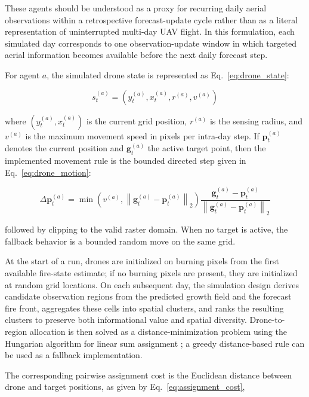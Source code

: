 \documentclass[10pt,letterpaper]{article}
\begin{document}
These agents should be understood as a proxy for recurring daily aerial
observations within a retrospective forecast-update cycle rather than as
a literal representation of uninterrupted multi-day UAV flight. In this
formulation, each simulated day corresponds to one observation-update
window in which targeted aerial information becomes available before the
next daily forecast step.

For agent $a$, the simulated drone state is represented as
Eq.~\ref{eq:drone_state}:

\begin{equation}
s_t^{(a)}=\left(y_t^{(a)},x_t^{(a)},r^{(a)},v^{(a)}\right)
\label{eq:drone_state}
\end{equation}

where $(y_t^{(a)},x_t^{(a)})$ is the current grid position,
$r^{(a)}$ is the sensing radius, and $v^{(a)}$ is the maximum movement
speed in pixels per intra-day step. If $\mathbf{p}_t^{(a)}$
denotes the current position and $\mathbf{g}_t^{(a)}$ the active target
point, then the implemented movement rule is the bounded directed step
given in Eq.~\ref{eq:drone_motion}:

\begin{equation}
\Delta \mathbf{p}_t^{(a)}=
\min\left(v^{(a)},\left\|\mathbf{g}_t^{(a)}-\mathbf{p}_t^{(a)}\right\|_2\right)
\frac{\mathbf{g}_t^{(a)}-\mathbf{p}_t^{(a)}}{\left\|\mathbf{g}_t^{(a)}-\mathbf{p}_t^{(a)}\right\|_2}
\label{eq:drone_motion}
\end{equation}

followed by clipping to the valid raster domain. When no target is
active, the fallback behavior is a bounded random move on the same grid.

At the start of a run, drones are initialized on burning pixels from the
first available fire-state estimate; if no burning pixels are present,
they are initialized at random grid locations. On each subsequent day,
the simulation design derives candidate observation regions from the predicted
growth field and the forecast fire front, aggregates these cells into
spatial clusters, and ranks the resulting clusters to preserve both
informational value and spatial diversity. Drone-to-region allocation is
then solved as a distance-minimization problem using the Hungarian
algorithm for linear sum assignment \cite{kuhn1955}; a greedy
distance-based rule can be used as a fallback implementation.

The corresponding pairwise assignment cost is the Euclidean distance
between drone and target positions, as given by Eq.~\ref{eq:assignment_cost},
\end{document}
